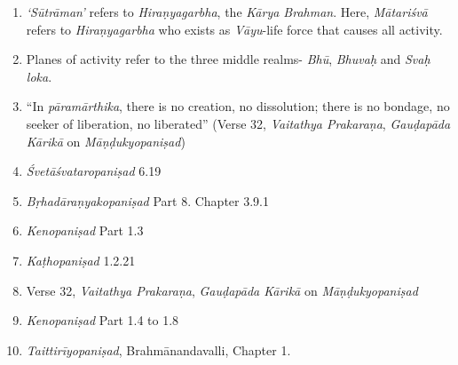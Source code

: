 \begin{enumerate}
\itemsep=0pt
\item
  \emph{`Sūtrāman'} refers to \emph{Hiraṇyagarbha}, the \emph{Kārya Brahman}. Here, \emph{Mātariśvā} refers to \emph{Hiraṇyagarbha} who exists as \emph{Vāyu}-life force that causes all activity.
\item
  Planes of activity refer to the three middle realms- \emph{Bhū}, \emph{Bhuvaḥ} and \emph{Svaḥ} \emph{loka}.
\item
  ``In \emph{pāramārthika}, there is no creation, no dissolution; there is no bondage, no seeker of liberation, no liberated'' (Verse 32, \emph{Vaitathya Prakaraṇa}, \emph{Gauḍapāda Kārikā} on \emph{Māṇḍukyopaniṣad})
\item
  \emph{Śvetāśvataropaniṣad} 6.19
\item
  \emph{Bṛhadāraṇyakopaniṣad} Part 8. Chapter 3.9.1
\item
  \emph{Kenopaniṣad} Part 1.3
\item
  \emph{Kaṭhopaniṣad} 1.2.21
\item
  Verse 32, \emph{Vaitathya Prakaraṇa}, \emph{Gauḍapāda Kārikā} on \emph{Māṇḍukyopaniṣad}
\item
  \emph{Kenopaniṣad} Part 1.4 to 1.8
\item
  \emph{Taittirīyopaniṣad}, Brahmānandavalli, Chapter 1.
\end{enumerate}

